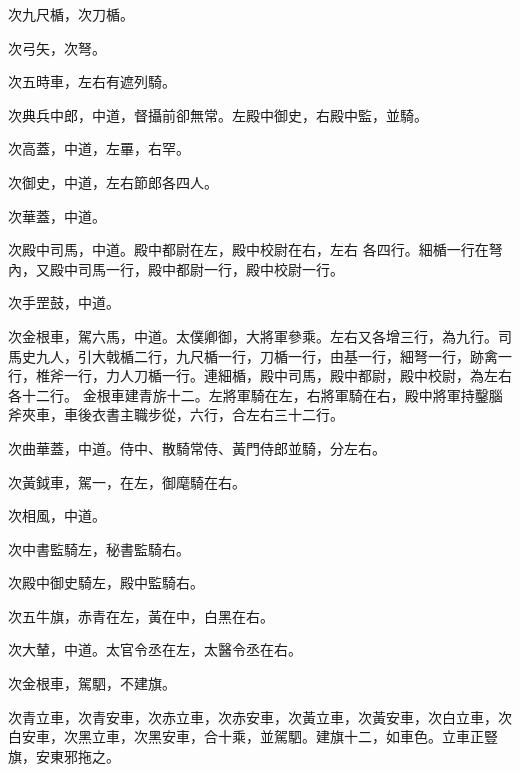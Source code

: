 \begin{pinyinscope}
 次九尺楯，次刀楯。



 次弓矢，次弩。



 次五時車，左右有遮列騎。



 次典兵中郎，中道，督攝前卻無常。左殿中御史，右殿中監，並騎。



 次高蓋，中道，左罼，右罕。



 次御史，中道，左右節郎各四人。



 次華蓋，中道。



 次殿中司馬，中道。殿中都尉在左，殿中校尉在右，左右
 各四行。細楯一行在弩內，又殿中司馬一行，殿中都尉一行，殿中校尉一行。



 次手罡鼓，中道。



 次金根車，駕六馬，中道。太僕卿御，大將軍參乘。左右又各增三行，為九行。司馬史九人，引大戟楯二行，九尺楯一行，刀楯一行，由基一行，細弩一行，跡禽一行，椎斧一行，力人刀楯一行。連細楯，殿中司馬，殿中都尉，殿中校尉，為左右各十二行。
 金根車建青旂十二。左將軍騎在左，右將軍騎在右，殿中將軍持鑿腦斧夾車，車後衣書主職步從，六行，合左右三十二行。



 次曲華蓋，中道。侍中、散騎常侍、黃門侍郎並騎，分左右。



 次黃鉞車，駕一，在左，御麾騎在右。



 次相風，中道。



 次中書監騎左，秘書監騎右。



 次殿中御史騎左，殿中監騎右。



 次五牛旗，赤青在左，黃在中，白黑在右。



 次大輦，中道。太官令丞在左，太醫令丞在右。



 次金根車，駕駟，不建旗。



 次青立車，次青安車，次赤立車，次赤安車，次黃立車，次黃安車，次白立車，次白安車，次黑立車，次黑安車，合十乘，並駕駟。建旗十二，如車色。立車正豎旗，安東邪拖之。




\end{pinyinscope}
